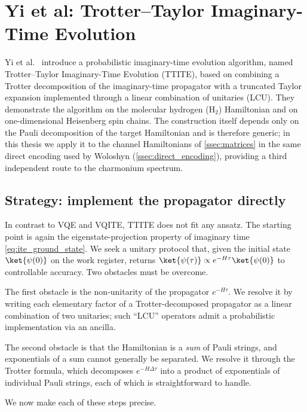 \section{Yi et al: Trotter--Taylor Imaginary-Time Evolution}
\label{sec:yi}

Yi et al.~\cite{yi2025} introduce a probabilistic imaginary-time evolution
algorithm, named Trotter--Taylor Imaginary-Time Evolution (TTITE), based
on combining a Trotter decomposition of the imaginary-time propagator
with a truncated Taylor expansion implemented through a linear
combination of unitaries (LCU). They demonstrate the algorithm on the
molecular hydrogen ($\mathrm{H}_{2}$) Hamiltonian and on one-dimensional
Heisenberg spin chains. The construction itself depends only on the
Pauli decomposition of the target Hamiltonian and is therefore generic;
in this thesis we apply it to the channel Hamiltonians of
\cref{ssec:matrices} in the same direct encoding used by Woloshyn
(\cref{ssec:direct_encoding}), providing a third independent route to
the charmonium spectrum.

\subsection{Strategy: implement the propagator directly}
\label{ssec:ttite_strategy}

In contrast to VQE and VQITE, TTITE does not fit any ansatz. The starting
point is again the eigenstate-projection property of imaginary time
\cref{eq:ite_ground_state}. We seek a unitary protocol that, given the
initial state $\ket{\psi(0)}$ on the work register, returns
\(
  \ket{\psi(\tau)} \propto e^{-H\tau}\ket{\psi(0)}
\)
to controllable accuracy. Two obstacles must be overcome.

The first obstacle is the non-unitarity of the propagator
$e^{-H\tau}$. We resolve it by writing each elementary factor of a
Trotter-decomposed propagator as a linear combination of two unitaries;
such ``LCU'' operators admit a probabilistic implementation via an
ancilla.

The second obstacle is that the Hamiltonian is a \emph{sum} of Pauli
strings, and exponentials of a sum cannot generally be separated. We
resolve it through the Trotter formula, which decomposes
$e^{-H\Delta\tau}$ into a product of exponentials of individual Pauli
strings, each of which is straightforward to handle.

We now make each of these steps precise.

